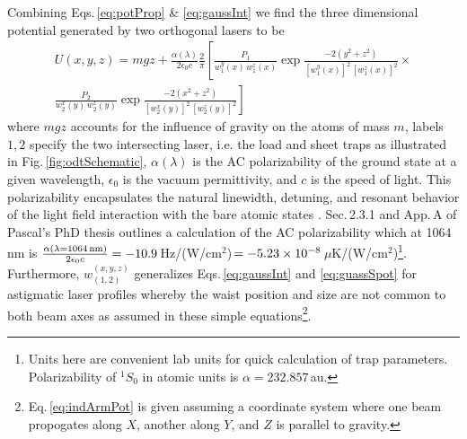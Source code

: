Combining Eqs.\,\ref{eq:potProp} \& \ref{eq:gaussInt} we find the three dimensional potential generated by two orthogonal lasers to be
\begin{equation} \label{eq:indArmPot}
\begin{split}
	U(x,y,z) = m g z + \frac{\alpha(\lambda)}{2 \epsilon_0 c} \frac{2}{\pi} \left[ \frac{P_1}{w_1^y(x)\, w_1^z(x)} \exp{\frac{-2 (y^2+z^2)}{[w_1^y(x)]^2 \,[w_1^z(x)]^2}} \times \right. \\
	\left. \frac{P_2}{w_2^x(y)\, w_2^z(y)} \exp{\frac{-2 (x^2+z^2)}{[w_2^x(y)]^2\,[w_2^z(y)]^2}} \right]
\end{split}
\end{equation}
where $mgz$ accounts for the influence of gravity on the atoms of mass $m$, labels $1,2$ specify the two intersecting laser, i.e. the load and sheet traps as illustrated in Fig.\,\ref{fig:odtSchematic}, $\alpha(\lambda)$ is the AC polarizability of the ground state at a given wavelength, $\epsilon_0$ is the vacuum permittivity, and $c$ is the speed of light.
This polarizability encapsulates the natural linewidth, detuning, and resonant behavior of the light field interaction with the bare atomic states \cite{Grimm1999a}.
Sec.\,2.3.1 and App.\,A of Pascal's PhD thesis \cite{Mickelson2010b} outlines a calculation of the AC polarizability which at 1064\,nm is $\frac{\alpha( \lambda = \text{1064\,nm} )}{2 \epsilon_0 c} = -10.9$\,Hz/(W/cm$^2$)\,$=-5.23\times 10^{-8}$\,$\mu$K/(W/cm$^2$)\footnote{Units here are convenient lab units for quick calculation of trap parameters. Polarizability of $^1S_0$ in atomic units is $\alpha = 232.857$\,au.}.
Furthermore, $w_{(1,2)}^{(x,y,z)}$ generalizes Eqs.\,\ref{eq:gaussInt} and \ref{eq:guassSpot} for astigmatic laser profiles whereby the waist position and size are not common to both beam axes as assumed in these simple equations\footnote{Eq.\,\ref{eq:indArmPot} is given assuming a coordinate system where one beam propogates along $X$, another along $Y$, and $Z$ is parallel to gravity.}.

